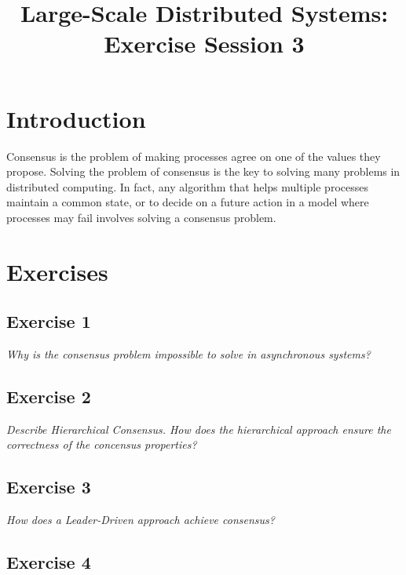 

\title{Large-Scale Distributed Systems: Exercise Session 3}
\maketitle

\section{Introduction}
\label{sec:introduction}

Consensus is the problem of making processes agree on one of the values they propose. Solving the problem of consensus is the key to solving many problems in distributed computing. In fact, any algorithm that helps multiple processes maintain a common state, or to decide on a future action in a model where processes may fail involves solving a consensus problem.

\section{Exercises}
\label{sec:exercises}

\subsection*{Exercise 1}
\label{sec:exercise_1}

\emph{Why is the consensus problem impossible to solve in asynchronous systems?}

\subsection*{Exercise 2}
\label{sec:exercise_2}

\emph{Describe Hierarchical Consensus. How does the hierarchical approach ensure the correctness of the concensus properties?}

\subsection*{Exercise 3}
\label{sec:exercise_3}

\emph{How does a Leader-Driven approach achieve consensus?}

\subsection*{Exercise 4}
\label{sec:exercise_4}

